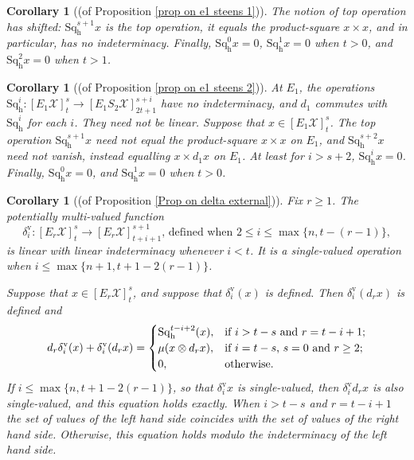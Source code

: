 \documentclass[11pt]{amsart} \renewcommand{\baselinestretch}{1.2}
\theoremstyle{plain}
\newtheorem{cor}[thm]{Corollary}
\numberwithin{equation}{section} %
\theoremstyle{plain}
\newtheorem{cor}[thm]{Corollary}
\numberwithin{equation}{chapter} %
\renewcommand{\to}{\longrightarrow}
\newcommand{\calx}{\mathcal{X}}
\newcommand{\Sq}{\mathrm{Sq}}
\newcommand{\E}[5]{[E^{#1}_{#2}#3]^{#4}_{#5}}
\newcommand{\Edownup}[5]{[E_{#1}^{#2}#3]^{#4}_{#5}}
\newcommand{\uver}{^\mathrm{v}}
\newcommand{\dhor}{_\mathrm{h}}
\newcommand{\Sqh}{\mathrm{Sq}\dhor}
\newcommand{\deltav}{\delta\uver}
\begin{document}
\begin{Operations on the Bousfield-Kan spectral sequence}
\begin{cor}[(of Proposition \ref{prop on e1 steens 1})]
The notion of \emph{top operation} has shifted: $\Sqh^{s+1}x$ is the top operation, it equals the product-square $x\times x$, and in particular,  has no indeterminacy.
Finally, $\Sqh^0x=0$, $\Sqh^{1}x=0$ when $t>0$, and $\Sqh^2x=0$ when $t>1$.
\end{cor}

\begin{cor}[(of Proposition \ref{prop on e1 steens 2})]
\label{prop on e1 steens 2 composed with lift}
At $E_1$, the operations $\Sqh^i:\Edownup{1}{}{\calx}{s}{t}\to \Edownup{1}{}{S_2\calx}{s+i}{2t+1}$ have no indeterminacy, and $d_{1}$ commutes with $\Sqh^i$ for each $i$. They need not be linear. Suppose that $x\in \Edownup{1}{}{\calx}{s}{t}$.
The top operation $\Sqh^{s+1}x$ need not equal the product-square $x\times x$ on $E_1$, and
$\Sqh^{s+2}x$ need not vanish, instead equalling $x\times d_1x$ on $E_1$.
At least for $i>s+2$, $\Sqh^ix=0$. Finally, $\Sqh^0x=0$, and $\Sqh^{1}x=0$ when $t>0$.
\end{cor}


\begin{cor}[(of Proposition \ref{Prop on delta external})]
\label{cor on delta external composed with lift}
Fix $r\geq1$. The potentially multi-valued function
\[\deltav_i:\Edownup{r}{}{\calx}{s}{t}\to \Edownup{r}{}{\calx}{s+1}{t+i+1}\text{, defined when }2\leq i\leq \max\{n,t-(r-1)\},\] 
is linear with linear indeterminacy whenever $i<t$. It is a single-valued operation when $i\leq \max\{n+1,t+1-2(r-1)\}$.


Suppose that $x\in \E{}{r}{\calx}{s}{t}$, and suppose that $\deltav_i ( x)$ is defined. Then $\deltav_i (d_r x)$ is defined and 
\[d_r\deltav_i(x)+ \deltav_i(d_rx)=\begin{cases}
\Sqh^{t-i+2}(x),&\textup{if $i>t-s$ and $r =t-i+1$};\\
\mu(x\otimes d_rx),&\textup{if $i=t-s$,  $s=0$ and $r\geq2$};\\
0,&\textup{otherwise.}
\end{cases}\]
If $i\leq \max\{n,t+1-2(r-1)\}$, so that $\deltav_i x$ is single-valued, then $\deltav_i d_r x$  is also single-valued, and this equation holds exactly.  When $i>t-s$ and $r =t-i+1$ the set of values of the left hand side coincides with the set of values of the right hand side. Otherwise, this equation holds modulo the indeterminacy of the left hand side. 


\end{cor}
\end{Operations on the Bousfield-Kan spectral sequence}
\end{document}
